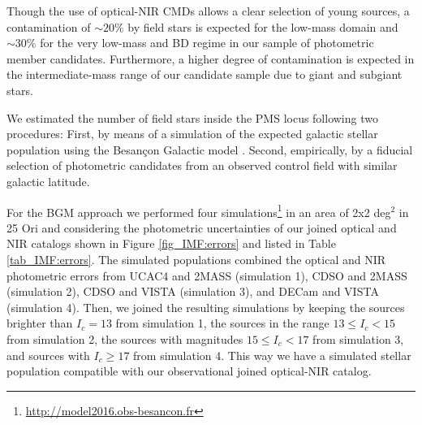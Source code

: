 \documentclass[12pt]{article}
\newcounter{subsubsubsection}[subsubsection]
\begin{document}
\label{sec_IMF:fieldcontam}
Though the use of optical-NIR CMDs allows a clear selection of young sources, a contamination of $\sim20$\% by field stars is expected for the low-mass domain \citep{Downes2014} and $\sim30$\% for the very low-mass and BD regime \citep{Downes2015} in our sample of photometric member candidates. Furthermore, a higher degree of contamination is expected in the intermediate-mass range of our candidate sample due to giant and subgiant stars.

We estimated the number of field stars inside the PMS locus following two procedures: First, by means of a simulation of the expected galactic stellar population using the Besan\c{c}on Galactic model \citep[hereafter \ac{BGM}; ][]{Robin2003}. Second, empirically, by a fiducial selection of photometric candidates from an observed control field with similar galactic latitude.

For the BGM approach we performed four simulations\footnote{\url{http://model2016.obs-besancon.fr}} in an area of 2x2 deg$^2$ in 25 Ori and considering the photometric uncertainties of our joined optical and NIR catalogs shown in Figure \ref{fig_IMF:errors} and listed in Table \ref{tab_IMF:errors}. The simulated populations combined the optical and NIR photometric errors from UCAC4 and 2MASS (simulation 1), CDSO and 2MASS (simulation 2), CDSO and VISTA (simulation 3), and DECam and VISTA (simulation 4). Then, we joined the resulting simulations by keeping the sources brighter than $I_c=13$ from simulation 1, the sources in the range $13 \le I_c<15$ from simulation 2, the sources with magnitudes $15 \le I_c<17$ from simulation 3, and sources with $I_c \ge 17$ from simulation 4. This way we have a simulated stellar population compatible with our observational joined optical-NIR catalog.
\end{document}
